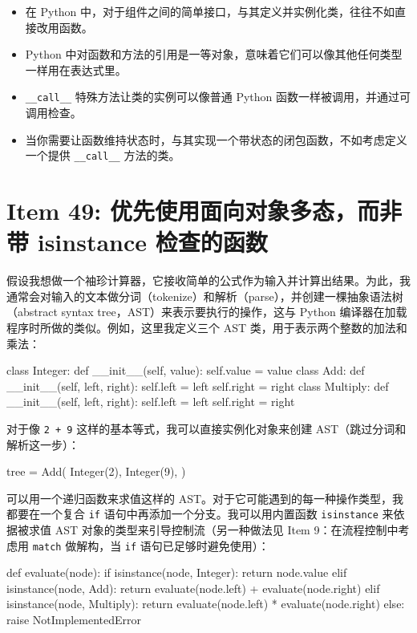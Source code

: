 \begin{itemize}
\item 在 Python 中，对于组件之间的简单接口，与其定义并实例化类，往往不如直接改用函数。
\item Python 中对函数和方法的引用是一等对象，意味着它们可以像其他任何类型一样用在表达式里。
\item \texttt{\_\_call\_\_} 特殊方法让类的实例可以像普通 Python 函数一样被调用，并通过可调用检查。
\item 当你需要让函数维持状态时，与其实现一个带状态的闭包函数，不如考虑定义一个提供 \texttt{\_\_call\_\_} 方法的类。
\end{itemize}

\section{Item 49: 优先使用面向对象多态，而非带 isinstance 检查的函数}

假设我想做一个袖珍计算器，它接收简单的公式作为输入并计算出结果。为此，我通常会对输入的文本做分词（tokenize）和解析（parse），并创建一棵抽象语法树（abstract syntax tree，AST）来表示要执行的操作，这与 Python 编译器在加载程序时所做的类似。例如，这里我定义三个 AST 类，用于表示两个整数的加法和乘法：

\begin{codebox}[python]
class Integer:
    def __init__(self, value):
        self.value = value
class Add:
    def __init__(self, left, right):
        self.left = left
        self.right = right
class Multiply:
    def __init__(self, left, right):
        self.left = left
        self.right = right
\end{codebox}

对于像 \texttt{2 + 9} 这样的基本等式，我可以直接实例化对象来创建 AST（跳过分词和解析这一步）：

\begin{codebox}[python]
tree = Add(
    Integer(2),
    Integer(9),
)
\end{codebox}

可以用一个递归函数来求值这样的 AST。对于它可能遇到的每一种操作类型，我都要在一个复合 \texttt{if} 语句中再添加一个分支。我可以用内置函数 \texttt{isinstance} 来依据被求值 AST 对象的类型来引导控制流（另一种做法见 Item 9：在流程控制中考虑用 \texttt{match} 做解构，当 \texttt{if} 语句已足够时避免使用）：

\begin{codebox}[python]
def evaluate(node):
    if isinstance(node, Integer):
        return node.value
    elif isinstance(node, Add):
        return evaluate(node.left) + evaluate(node.right)
    elif isinstance(node, Multiply):
        return evaluate(node.left) * evaluate(node.right)
    else:
        raise NotImplementedError
\end{codebox}

